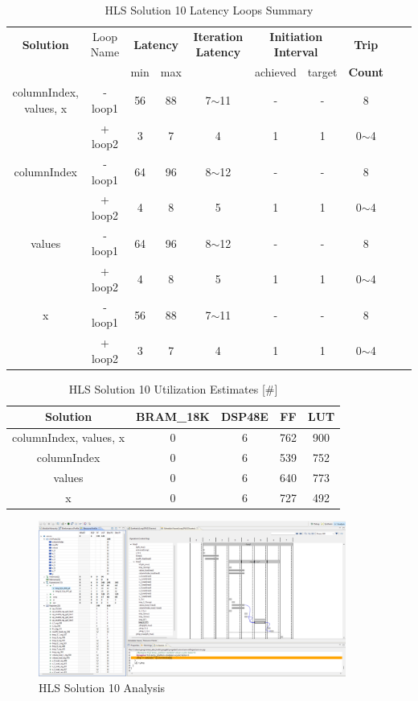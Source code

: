 \begin{table}[H]
	\centering
	\begin{tabular}{|c|c|c|c|c|c|c|c|c|c|}
		\hline
		\multicolumn{1}{|c|}{\textbf{Solution}} & \multicolumn{1}{|c|}{Loop Name} & \multicolumn{2}{|c|}{\textbf{Latency}} & \multicolumn{1}{c|}{\textbf{Iteration Latency}} & \multicolumn{2}{c|}{\textbf{Initiation Interval}} & \multicolumn{1}{c|}{\textbf{Trip}}  \\
		&  & min & max & & achieved & target & \textbf{Count} \\
		\hline
		columnIndex, values, x & - loop1 & 56 & 88 & 7$\sim$11 & - & - & 8 \\
		& + loop2 & 3 & 7 & 4 & 1 & 1 & 0$\sim$4 \\
		\hline
		columnIndex & - loop1 & 64 & 96 & 8$\sim$12 & - & - & 8 \\
		& + loop2 & 4 & 8 & 5 & 1 & 1 & 0$\sim$4 \\
		\hline
		values & - loop1 & 64 & 96 & 8$\sim$12 & - & - & 8 \\
		& + loop2 & 4 & 8 & 5 & 1 & 1 & 0$\sim$4 \\
		\hline
		x & - loop1 & 56 & 88 & 7$\sim$11 & - & - & 8 \\
		& + loop2 & 3 & 7 & 4 & 1 & 1 & 0$\sim$4 \\
		\hline
	\end{tabular}
	\caption{HLS Solution 10 Latency Loops Summary }
	\label{tab:hls-solution-10-loop-summary}
\end{table}

\begin{table}[H]
	\centering
	\begin{tabular}{|c|c|c|c|c|}
		\hline
		\textbf{Solution} & \textbf{BRAM\_18K} & \textbf{DSP48E} & \textbf{FF} & \textbf{LUT} \\
		\hline
		columnIndex, values, x & 0 & 6 & 762 & 900 \\
		\hline
		columnIndex & 0 & 6 & 539 & 752 \\
		\hline
		values & 0 & 6 & 640 & 773 \\
		\hline
		x & 0 & 6 & 727 & 492 \\
		\hline
	\end{tabular}
	\caption{HLS Solution 10 Utilization Estimates [\#]}
	\label{tab:hls-solution-10-utilization-report}
\end{table}

\begin{figure}[H]
	\centering
	\includegraphics[width=0.9\textwidth]{solutions/s10/s10analysis.png}
	\caption{HLS Solution 10 Analysis}
\end{figure}

